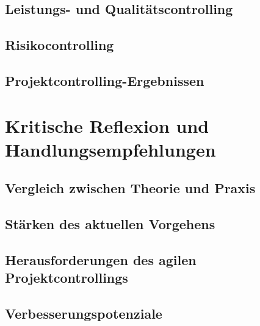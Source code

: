 \documentclass[
    12pt, 
    a4paper,
    ]{scrartcl} %
\begin{document}
\subsection{Leistungs- und Qualitätscontrolling}
\subsection{Risikocontrolling}

\subsection{Projektcontrolling-Ergebnissen}


\section{Kritische Reflexion und Handlungsempfehlungen}
\subsection{Vergleich zwischen Theorie und Praxis}

\subsection{Stärken des aktuellen Vorgehens}

\subsection{Herausforderungen des agilen Projektcontrollings}

\subsection{Verbesserungspotenziale}
\end{document}
